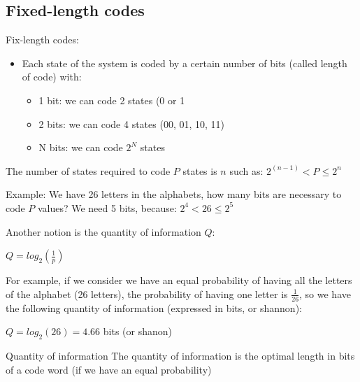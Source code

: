 \documentclass{beamer}[10pt, usepdftitle=false, handout]
\begin{document}
	\subsection{Fixed-length codes}

	\begin{frame}
	
	Fix-length codes:
			\vspace*{1em}	
	
	\begin{itemize}
	\item{Each state of the system is coded by a certain number of bits (called length of code) with:
		\begin{itemize}
			\item{1 bit: we can code 2 states (0 or 1}
			\item{2 bits: we can code 4 states (00, 01, 10, 11)}
			\item{N bits: we can code $2^N$ states}
		\end{itemize}
	}	
	
	\end{itemize}
	
	The number of states required to code $P$ states is $n$ such as: 
	$2^{(n-1)} < P \leq 2^n$  	
		\vspace*{1em}	
	
	Example: We have 26 letters in the alphabets, how many bits are necessary to code $P$ values?
	We need 5 bits, because: $2^4 < 26 \leq 2^5$	
	
	
	\end{frame}
	
	\begin{frame}
	
	Another notion is the quantity of information $Q$:
		\vspace*{1em}	

	$Q = log_2(\frac{1}{p})$
		\vspace*{1em}	
	
	For example, if we consider we have an equal probability of having all the letters of the alphabet (26 letters), the probability of having one letter is $\frac{1}{26}$, so we have the following quantity of information (expressed in bits, or shannon):
		\vspace*{1em}	

	
	$Q = log_2(26) = 4.66$ bits (or shanon)
		\vspace*{1em}	
	
	\begin{block}{Quantity of information}
	The quantity of information is the optimal length in bits of a code word (if we have an equal probability) 
	\end{block}
		
	\end{frame}	
\end{document}
